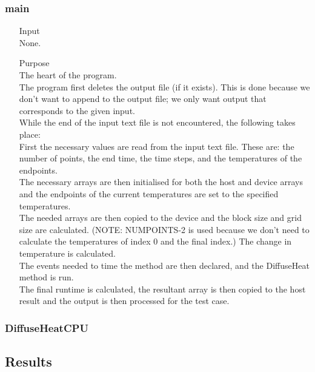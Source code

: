 \documentclass[11pt,a4paper]{article}
\begin{document}
\subsubsection{main}
\begin{itemize}
	\item[Input] \hfill\\
	None.
	\item[Purpose] \hfill\\
	The heart of the program.\\
	The program first deletes the output file (if it exists). This is done because we don't want to append to the output file; we only want output that corresponds to the given input.\\
	While the end of the input text file is not encountered, the following takes place:\\
	First the necessary values are read from the input text file. These are: the number of points, the end time, the time steps, and the temperatures of the endpoints.\\
	The necessary arrays are then initialised for both the host and device arrays and the endpoints of the current temperatures are set to the specified temperatures.\\
	The needed arrays are then copied to the device and the block size and grid size are calculated. (NOTE: NUMPOINTS-2 is used because we don't need to calculate the temperatures of index 0 and the final index.)
	The change in temperature is calculated.\\
	The events needed to time the method are then declared, and the DiffuseHeat method is run.\\
	The final runtime is calculated, the resultant array is then copied to the host result and the output is then processed for the test case.
\end{itemize}

\subsubsection{DiffuseHeatCPU}

\subsection{Results}

\newpage
{}
\end{document}
